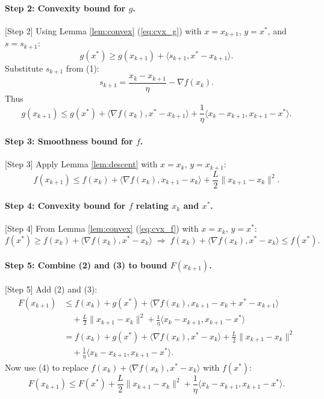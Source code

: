 \documentclass{article}
\begin{document}
\paragraph{Step 2: Convexity bound for $g$.} [Step 2]
Using Lemma \ref{lem:convex} (\ref{eq:cvx_g}) with $x = x_{k+1}$, $y = x^*$, and $s = s_{k+1}$:
\[
g(x^*) \ge g(x_{k+1}) + \langle s_{k+1}, x^* - x_{k+1} \rangle.
\]
Substitute $s_{k+1}$ from (1):
\[
s_{k+1} = \frac{x_k - x_{k+1}}{\eta} - \nabla f(x_k).
\]
Thus
\[
g(x_{k+1}) \le g(x^*) + \langle \nabla f(x_k), x^* - x_{k+1} \rangle + \frac{1}{\eta}\langle x_k - x_{k+1}, x_{k+1} - x^* \rangle. \tag{2}
\]

\paragraph{Step 3: Smoothness bound for $f$.} [Step 3]
Apply Lemma \ref{lem:descent} with $x = x_k$, $y = x_{k+1}$:
\[
f(x_{k+1}) \le f(x_k) + \langle \nabla f(x_k), x_{k+1} - x_k \rangle + \frac{L}{2}\|x_{k+1} - x_k\|^2. \tag{3}
\]

\paragraph{Step 4: Convexity bound for $f$ relating $x_k$ and $x^*$.} [Step 4]
From Lemma \ref{lem:convex} (\ref{eq:cvx_f}) with $x = x_k$, $y = x^*$:
\[
f(x^*) \ge f(x_k) + \langle \nabla f(x_k), x^* - x_k \rangle
\;\Longrightarrow\;
f(x_k) + \langle \nabla f(x_k), x^* - x_k \rangle \le f(x^*). \tag{4}
\]

\paragraph{Step 5: Combine (2) and (3) to bound $F(x_{k+1})$.} [Step 5]
Add (2) and (3):
\begin{align*}
F(x_{k+1}) &\le f(x_k) + g(x^*) + \langle \nabla f(x_k), x_{k+1} - x_k + x^* - x_{k+1} \rangle \\
&\quad + \frac{L}{2}\|x_{k+1} - x_k\|^2 + \frac{1}{\eta}\langle x_k - x_{k+1}, x_{k+1} - x^* \rangle \\
&= f(x_k) + g(x^*) + \langle \nabla f(x_k), x^* - x_k \rangle + \frac{L}{2}\|x_{k+1} - x_k\|^2 \\
&\quad + \frac{1}{\eta}\langle x_k - x_{k+1}, x_{k+1} - x^* \rangle.
\end{align*}
Now use (4) to replace $f(x_k) + \langle \nabla f(x_k), x^* - x_k \rangle$ with $f(x^*)$:
\[
F(x_{k+1}) \le F(x^*) + \frac{L}{2}\|x_{k+1} - x_k\|^2 + \frac{1}{\eta}\langle x_k - x_{k+1}, x_{k+1} - x^* \rangle. \tag{5}
\]
\end{document}
